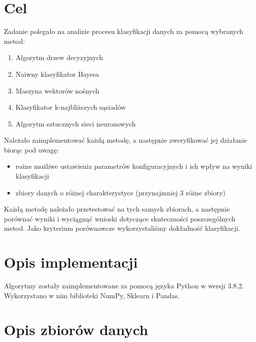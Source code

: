 \documentclass[a4paper,11pt]{article}
\begin{document}
\setcounter{page}{2}
\tableofcontents
\newpage
{}


\section{Cel} \label{sec:cel}
Zadanie polegało na analizie procesu klasyfikacji danych za pomocą wybranych metod:

\begin{enumerate}
    \item Algorytm drzew decyzyjnych
    \item Naiwny klasyfikator Bayesa
    \item Maszyna wektorów nośnych
    \item Klasyfikator k-najbliższych sąsiadów
    \item Algorytm sztucznych sieci neuronowych
\end{enumerate}

Należało zaimplementować każdą metodę, a następnie zweryfikować jej działanie biorąc pod uwagę:

\begin{itemize}
    \item rożne możliwe ustawienia parametrów konfiguracyjnych i ich wpływ na wyniki klasyfikacji
    \item zbiory danych o różnej charakterystyce (przynajmniej 3 różne zbiory)
\end{itemize}

Każdą metodę należało przetestować na tych samych zbiorach, a następnie porównać wyniki i wyciągnąć wnioski dotyczące skuteczności poszczególnych metod. Jako kryterium porównawcze wykorzystaliśmy dokładność klasyfikacji.


\section{Opis implementacji}

Algorytmy zostały zaimplementowane za pomocą języka Python w wersji 3.8.2.
Wykorzystano w nim biblioteki NumPy, Sklearn i Pandas. 


\section{Opis zbiorów danych} \label{sec:dataset}
\end{document}
